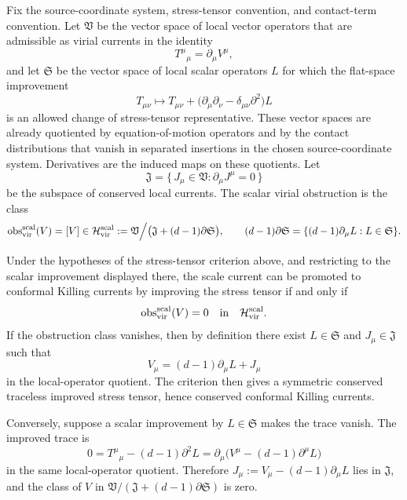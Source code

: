 \begin{definition}
\label{def:virial-improvement-quotient}
Fix the source-coordinate system, stress-tensor convention, and contact-term convention.
Let \(\mathfrak V\) be the vector space of local vector operators that are
admissible as virial currents in the identity
\[
  T^\mu{}_\mu=\partial_\mu V^\mu ,
\]
and let \(\mathfrak S\) be the vector space of local scalar operators \(L\) for
which the flat-space improvement
\[
  T_{\mu\nu}\longmapsto
  T_{\mu\nu}
  +
  \bigl(\partial_\mu\partial_\nu-\delta_{\mu\nu}\partial^2\bigr)L
\]
is an allowed change of stress-tensor representative.  These vector spaces are
already quotiented by equation-of-motion operators and by the contact
distributions that vanish in separated insertions in the chosen source-coordinate system.
Derivatives are the induced maps on these quotients.  Let
\[
  \mathfrak J
  =
  \{\,J_\mu\in\mathfrak V:\partial_\mu J^\mu=0\,\}
\]
be the subspace of conserved local currents.  The scalar virial obstruction is
the class
\[
  {\rm obs}_{\rm vir}^{\rm scal}(V)
  =
  [V]
  \in
  \mathcal H_{\rm vir}^{\rm scal}
  :=
  \mathfrak V\Big/
  \bigl(\mathfrak J+(d-1)\partial\mathfrak S\bigr),
  \qquad
  (d-1)\partial\mathfrak S
  =
  \{(d-1)\partial_\mu L:L\in\mathfrak S\}.
\]
\end{definition}

\begin{remark}
\label{rem:virial-obstruction-iff}
Under the hypotheses of the stress-tensor criterion above, and restricting
to the scalar improvement displayed there, the scale current can be promoted to
conformal Killing currents by improving the stress tensor if and only if
\[
  {\rm obs}_{\rm vir}^{\rm scal}(V)=0
  \quad\text{in}\quad
  \mathcal H_{\rm vir}^{\rm scal}.
\]
If the obstruction class vanishes, then by definition there exist
\(L\in\mathfrak S\) and \(J_\mu\in\mathfrak J\) such that
\[
  V_\mu=(d-1)\partial_\mu L+J_\mu
\]
in the local-operator quotient.  The criterion then gives a symmetric
conserved traceless improved stress tensor, hence
conserved conformal Killing currents.

Conversely, suppose a scalar improvement by \(L\in\mathfrak S\) makes the
trace vanish.  The improved trace is
\[
  0
  =
  T^\mu{}_\mu-(d-1)\partial^2L
  =
  \partial_\mu\bigl(V^\mu-(d-1)\partial^\mu L\bigr)
\]
in the same local-operator quotient.  Therefore
\(J_\mu:=V_\mu-(d-1)\partial_\mu L\) lies in \(\mathfrak J\), and the class of
\(V\) in
\(\mathfrak V/(\mathfrak J+(d-1)\partial\mathfrak S)\) is zero.
\end{remark}


